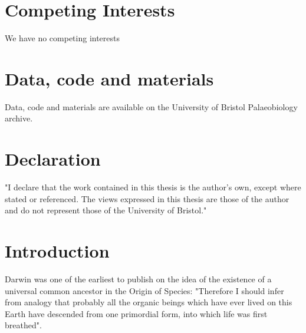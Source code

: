 \section{Competing Interests}
We have no competing interests
 	
\section{Data, code and materials}
Data, code and materials are available on the University of Bristol Palaeobiology archive.

\newpage
\section{Declaration}

"I declare that the work contained in this thesis is the author's own, except where stated or referenced. The views expressed in this thesis are those of the author and do not represent those of the University of Bristol."

 

\setlength\parindent{.45in} 

\newpage
\tableofcontents
\newpage

\doublespacing

\section{Introduction}
Darwin was one of the earliest to publish on the idea of the existence of a universal common ancestor in the Origin of Species: "Therefore I should infer from analogy that probably all the organic beings which have ever lived on this Earth have descended from one primordial form, into which life was first breathed"\cite{darwin1880origin}.

